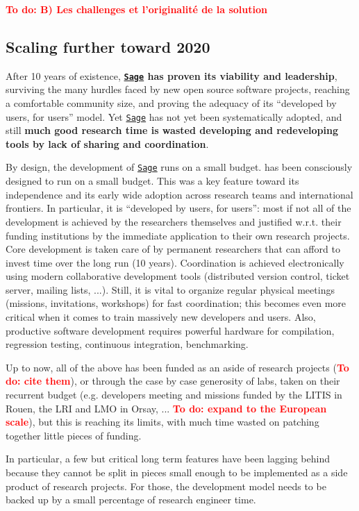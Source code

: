 \documentclass[a4,12pt]{amsart}
\newcommand{\sage}{\href{http://www.sagemath.org/}{\texttt{Sage}}\xspace}
\newcommand{\TODO}[2][To do: ]{{\textcolor{red}{\textbf{#1#2}}}}
\begin{document}
\TODO{B) Les challenges et l'originalité de la solution}

\subsection*{Scaling further toward 2020}

After 10 years of existence, \textbf{\sage has proven its viability
  and leadership}, surviving the many hurdles faced by new open source
software projects, reaching a comfortable community size, and proving
the adequacy of its ``developed by users, for users'' model.  Yet
\sage has not yet been systematically adopted, and still \textbf{much
  good research time is wasted developing and redeveloping tools by
  lack of sharing and coordination}.

By design, the development of \sage runs on a small budget.
 has been consciously designed to
run on a small budget. This was a key feature toward its independence
and its early wide adoption across research teams and international
frontiers. In particular, it is ``developed by users, for users'':
most if not all of the development is achieved by the researchers
themselves and justified w.r.t. their funding institutions by the
immediate application to their own research projects. Core development
is taken care of by permanent researchers that can afford to invest
time over the long run (10 years). Coordination is achieved
electronically using modern collaborative development tools
(distributed version control, ticket server, mailing lists, ...).
Still, it is vital to organize regular physical meetings (missions,
invitations, workshops) for fast coordination; this becomes even more
critical when it comes to train massively new developers and users.
Also, productive software development requires powerful hardware for
compilation, regression testing, continuous integration,
benchmarking.

Up to now, all of the above has been funded as an aside of research
projects (\TODO{cite them}), or through the case by case generosity of
labs, taken on their recurrent budget (e.g. developers meeting and
missions funded by the LITIS in Rouen, the LRI and LMO in Orsay,
... \TODO{expand to the European scale}), but this is reaching its
limits, with much time wasted on patching together little pieces of
funding.

In particular, a few but critical long term features have been lagging
behind because they cannot be split in pieces small enough to be
implemented as a side product of research projects.  For those, the
development model needs to be backed up by a small percentage of
research engineer time.
\end{document}
